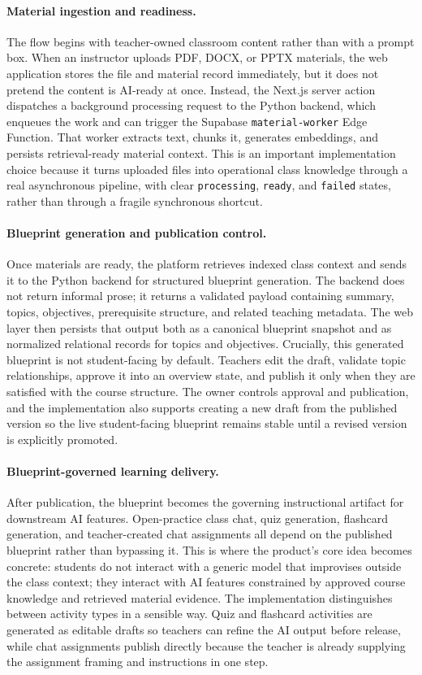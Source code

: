 \documentclass[11pt,a4paper]{article}
\begin{document}
\paragraph*{Material ingestion and readiness.}
The flow begins with teacher-owned classroom content rather than with a prompt box. When an
instructor uploads PDF, DOCX, or PPTX materials, the web application stores the file and material
record immediately, but it does not pretend the content is AI-ready at once. Instead, the Next.js
server action dispatches a background processing request to the Python backend, which enqueues the
work and can trigger the Supabase \texttt{material-worker} Edge Function. That worker extracts text,
chunks it, generates embeddings, and persists retrieval-ready material context. This is an important
implementation choice because it turns uploaded files into operational class knowledge through a
real asynchronous pipeline, with clear \texttt{processing}, \texttt{ready}, and \texttt{failed}
states, rather than through a fragile synchronous shortcut.

\paragraph*{Blueprint generation and publication control.}
Once materials are ready, the platform retrieves indexed class context and sends it to the Python
backend for structured blueprint generation. The backend does not return informal prose; it returns a
validated payload containing summary, topics, objectives, prerequisite structure, and related
teaching metadata. The web layer then persists that output both as a canonical blueprint snapshot and
as normalized relational records for topics and objectives. Crucially, this generated blueprint is
not student-facing by default. Teachers edit the draft, validate topic relationships, approve it into
an overview state, and publish it only when they are satisfied with the course structure. The owner
controls approval and publication, and the implementation also supports creating a new draft from the
published version so the live student-facing blueprint remains stable until a revised version is
explicitly promoted.

\paragraph*{Blueprint-governed learning delivery.}
After publication, the blueprint becomes the governing instructional artifact for downstream AI
features. Open-practice class chat, quiz generation, flashcard generation, and teacher-created chat
assignments all depend on the published blueprint rather than bypassing it. This is where the
product's core idea becomes concrete: students do not interact with a generic model that improvises
outside the class context; they interact with AI features constrained by approved course knowledge and
retrieved material evidence. The implementation distinguishes between activity types in a sensible
way. Quiz and flashcard activities are generated as editable drafts so teachers can refine the AI
output before release, while chat assignments publish directly because the teacher is already
supplying the assignment framing and instructions in one step.
\end{document}
